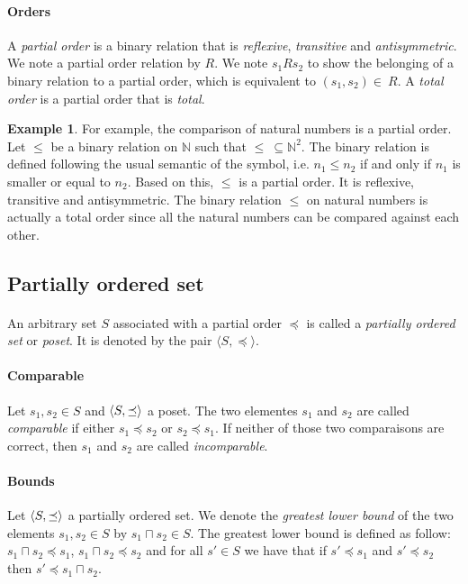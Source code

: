 \documentclass[letterpaper]{article}
\DeclarePairedDelimiter{\tuple}{\langle}{\rangle}
\theoremstyle{definition}
\newtheorem{example}{Example}[subsection]
\begin{document}
\paragraph{Orders}

A \textit{partial order} is a binary relation that is \textit{reflexive},
\textit{transitive} and \textit{antisymmetric}. We note a
partial order relation by $R$.
We note $s_1 R  s_2$ to show the belonging of
a binary relation to a partial order, which is equivalent
to $(s_1, s_2) \in \ R$.
A \textit{total order} is a partial order that is \textit{total}.

\begin{example}

For example, the comparison of natural numbers is a partial order.
Let $\leq$ be a binary relation on $\mathbb{N}$
such that $\leq \ \subseteq \mathbb{N}^2$. The binary relation is defined
following the usual semantic of the symbol, i.e. $n_1 \leq n_2$ if and
only if $n_1$ is smaller or equal to $n_2$.
Based on this, $\leq$ is a partial order. It is
reflexive, transitive and antisymmetric.
The binary relation $\leq$ on natural numbers is actually a total
order since all the natural numbers can be compared against each other.

\end{example}

\subsection{Partially ordered set}

\paragraph{}

An arbitrary set $S$ associated with a partial order $\preceq$
is called a \textit{partially ordered set} or \textit{poset}.
It is denoted by the pair $\langle S, \preceq \rangle$.

\paragraph{Comparable}

Let $s_1, s_2 \in S$ and $\tuple{S, \preceq}$ a poset.
The two elementes $s_1$ and $s_2$ are called \textit{comparable} if either
$s_1 \preceq s_2$ or $s_2 \preceq s_1$. If neither of those two comparaisons
are correct, then $s_1$ and $s_2$ are called \textit{incomparable}.


\paragraph{Bounds} Let $\tuple{S, \preceq}$ a partially ordered set.
We denote the \textit{greatest lower bound} of the two elements $s_1,
s_2 \in S$
by $s_1 \sqcap s_2 \in S$.
The greatest lower bound is defined as follow:
$s_1 \sqcap s_2 \preceq s_1$,
$s_1 \sqcap s_2 \preceq s_2$ and for all $s' \in S$ we have that
if $s' \preceq s_1$ and $s' \preceq s_2$ then $s' \preceq s_1 \sqcap s_2$.
\end{document}

